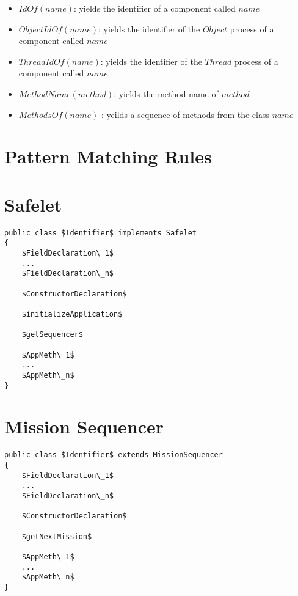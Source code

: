 \documentclass[11pt,a4paper]{article}
\begin{document}
\begin{itemize}
\item $IdOf(name)$: yields the identifier of a component called $name$
\item $ObjectIdOf(name)$: yields the identifier of the $Object$ process of a component called $name$
\item $ThreadIdOf(name)$: yields the identifier of the $Thread$ process of a component called $name$
\item $MethodName(method)$: yields the method name of $method$
\item $MethodsOf(name)$ : yeilds a sequence of methods from the class $name$
\end{itemize}
\newpage
\section*{Pattern Matching Rules}

\section*{Safelet}
\begin{lstlisting}
public class $Identifier$ implements Safelet
{
	$FieldDeclaration\_1$
	...
	$FieldDeclaration\_n$

	$ConstructorDeclaration$

	$initializeApplication$

	$getSequencer$

	$AppMeth\_1$
	...
	$AppMeth\_n$
}
\end{lstlisting}



\newpage

\section*{Mission Sequencer}

\begin{lstlisting}
public class $Identifier$ extends MissionSequencer
{
	$FieldDeclaration\_1$
	...
	$FieldDeclaration\_n$

	$ConstructorDeclaration$

	$getNextMission$

	$AppMeth\_1$
	...
	$AppMeth\_n$
}
\end{lstlisting}



\newpage
\end{document}
